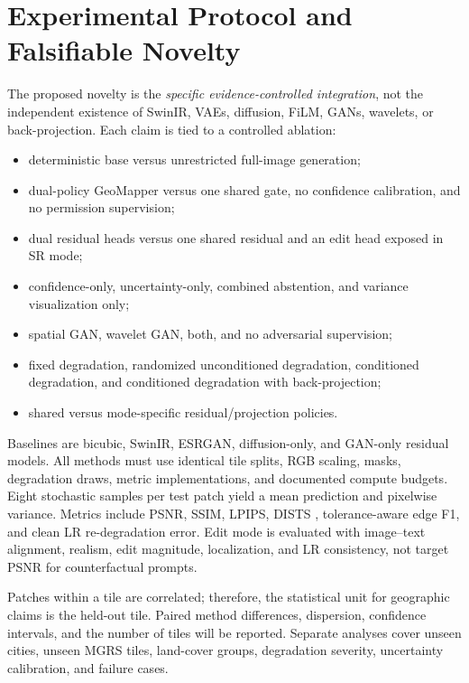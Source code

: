 \documentclass[10pt]{article}
\begin{document}
\clearpage

\section{Experimental Protocol and Falsifiable Novelty}
The proposed novelty is the \emph{specific evidence-controlled integration}, not the independent
existence of SwinIR, VAEs, diffusion, FiLM, GANs, wavelets, or back-projection. Each claim is tied
to a controlled ablation:
\begin{itemize}
  \item deterministic base versus unrestricted full-image generation;
  \item dual-policy GeoMapper versus one shared gate, no confidence calibration, and no permission
        supervision;
  \item dual residual heads versus one shared residual and an edit head exposed in SR mode;
  \item confidence-only, uncertainty-only, combined abstention, and variance visualization only;
  \item spatial GAN, wavelet GAN, both, and no adversarial supervision;
  \item fixed degradation, randomized unconditioned degradation, conditioned degradation, and
        conditioned degradation with back-projection;
  \item shared versus mode-specific residual/projection policies.
\end{itemize}

Baselines are bicubic, SwinIR, ESRGAN, diffusion-only, and GAN-only residual models. All methods
must use identical tile splits, RGB scaling, masks, degradation draws, metric implementations, and
documented compute budgets. Eight stochastic samples per test patch yield a mean prediction and
pixelwise variance. Metrics include PSNR, SSIM, LPIPS, DISTS
\citep{ding2020dists}, tolerance-aware edge F1, and clean LR re-degradation error. Edit mode is
evaluated with image--text alignment, realism, edit magnitude, localization, and LR consistency,
not target PSNR for counterfactual prompts.

Patches within a tile are correlated; therefore, the statistical unit for geographic claims is the
held-out tile. Paired method differences, dispersion, confidence intervals, and the number of
tiles will be reported. Separate analyses cover unseen cities, unseen MGRS tiles, land-cover
groups, degradation severity, uncertainty calibration, and failure cases.
\end{document}
